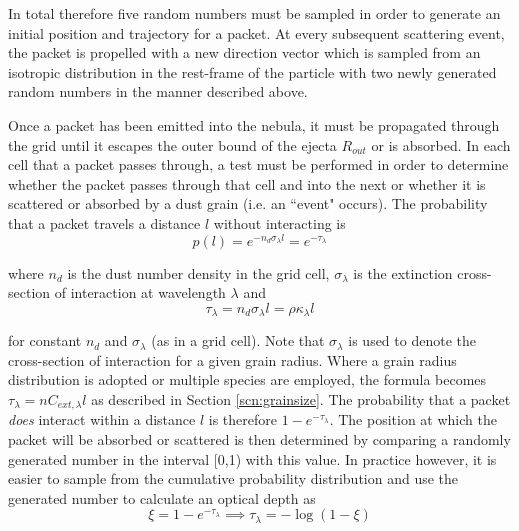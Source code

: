 In total therefore five random numbers must be sampled in order to generate an initial position and trajectory for a packet. At every subsequent scattering event, the packet is propelled with a new direction vector which is sampled from an isotropic distribution in the rest-frame of the particle with two newly generated random numbers in the manner described above.  


Once a packet has been emitted into the nebula, it must be propagated through the grid until it escapes the outer bound of the ejecta $R_{out}$ or is absorbed.  In each cell that a packet passes through, a test must be performed in order to determine whether the packet passes through that cell and into the next or whether it is scattered or absorbed by a dust grain (i.e. an ``event" occurs).  The probability that a packet travels a distance $l$ without interacting is 
\begin{equation}
p(l)=e^{-n_d \sigma_{\lambda} l}=e ^{-\tau_{\lambda}} 
\end{equation}

\noindent where $n_d$ is the dust number density in the grid cell, $\sigma_{\lambda}$ is the extinction cross-section of interaction at wavelength $\lambda$ and 
\begin{equation}
\tau_{\lambda} = n_d\sigma_{\lambda} l = \rho \kappa_{\lambda}  l
\end{equation}

\noindent for constant $n_d$ and $\sigma_{\lambda}$ (as in a grid cell).  Note that $\sigma_{\lambda}$ is used to denote the cross-section of interaction for a given grain radius.  Where a grain radius distribution is adopted or multiple species are employed, the formula becomes $\tau_{\lambda} = nC_{ext,\lambda}l$ as described in Section \ref{scn:grainsize}.  The probability that a packet \textit{does} interact within a distance $l$ is therefore $1-e^{-\tau_{\lambda}}$.  The position at which the packet will be absorbed or scattered is then determined by comparing a randomly generated number in the interval [0,1) with this value.  In practice however, it is easier to sample from the cumulative probability distribution and use the generated number to calculate an optical depth as 
\begin{equation}
\xi = 1 - e^{-\tau_{\lambda}}  \implies  \tau_{\lambda}=-\log (1-\xi) 
\end{equation}

